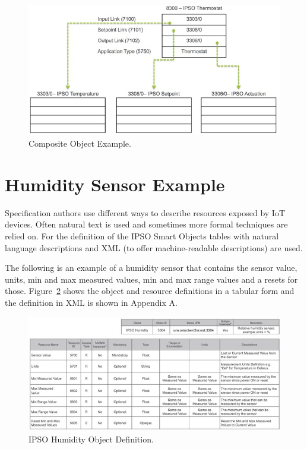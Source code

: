 \documentclass[peerreview, a4paper, 7pt]{IEEEtran}
\begin{document}
\begin{figure}[!t]
 \centering
 \includegraphics[scale=0.50]{composite-object.jpg}
 \caption{Composite Object Example.}
 \label{composite-object-figure}
\end{figure}

\section{Humidity Sensor Example}

Specification authors use different ways to describe resources exposed by IoT devices. Often natural text is used and sometimes more formal techniques are relied on. For the definition of the IPSO Smart Objects tables with natural language descriptions and XML (to offer machine-readable descriptions) are used.

The following is an example of a humidity sensor that contains the sensor value, units, min and max measured values, min and max range values and a resets for those. Figure~\ref{humidity-object-figure} shows the object and resource definitions in a tabular form and the definition in XML is shown in Appendix A. 

\begin{figure}[!t]
 \centering
 \includegraphics[scale=0.70]{humidity-object.jpg}
 \caption{IPSO Humidity Object Definition.}
 \label{humidity-object-figure}
\end{figure}
\end{document}
